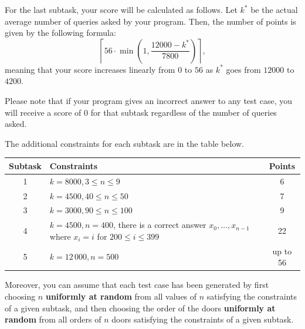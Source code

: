 For the last subtask, your score will be calculated as follows.
Let $k^{*}$ be the actual average number of queries asked by your program. Then, the
number of points is given by the following formula:
\[
\left\lceil 56 \cdot \min\left(1, \frac{12000-k^{*}}{7800}\right)\right\rceil,
\]
meaning that your score increases linearly from $0$ to $56$ as $k^{*}$ goes from $12000$ to $4200$.

Please note that if your program gives an incorrect answer to any test case, you will receive a score
of $0$ for that subtask
regardless of the number of queries asked.

The additional constraints for each subtask are in the table below.

\begin{center}
\begin{tabular}{|c|p{13cm}|c|}
\hline
\textbf{Subtask} & \textbf{Constraints} & \textbf{Points} \\ \hline
1 & $k=8000, 3\leq n\leq 9$ & 6 \\ \hline
2 & $k=4500, 40\leq n\leq 50$ & 7 \\ \hline
3 & $k=3000, 90\leq n\leq 100$ & 9 \\ \hline
4 & $k=4500, n=400$, there is a correct answer $x_0,\dots,x_{n-1}$ where $x_i=i$ for $200\leq i\leq 399$ & 22 \\ \hline
5 & $k=12\,000, n=500$ & up to 56 \\ \hline
\end{tabular}
\end{center}

Moreover, you can assume that each test case has been generated by first choosing
$n$ \textbf{uniformly at random} from all values of $n$ satisfying the constraints of a given subtask,
and then choosing the order of the doors \textbf{uniformly at random} from all orders
of $n$ doors satisfying the constraints of a given subtask.
